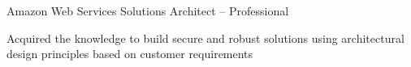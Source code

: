 

\begin{cventries}

  \cventry
  {Amazon Web Services} %
  {Solutions Architect – Professional} %
  {} %
  {} %
  {
    \begin{cvitems} %
      \item {Acquired the knowledge to build secure and robust solutions using architectural design principles based on customer requirements}
    \end{cvitems}
  }


\end{cventries}
